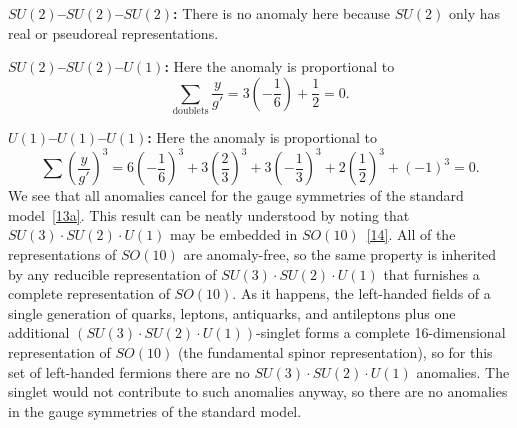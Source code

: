 \noindent\textbf{\boldmath$SU(2)$--$SU(2)$--$SU(2)$:}
There is no anomaly here because $SU(2)$ only has real or pseudoreal
representations.

\noindent\textbf{\boldmath$SU(2)$--$SU(2)$--$U(1)$:}
Here the anomaly is proportional to
\[
 \sum_{\text{doublets}}\frac{y}{g'}
 =3\left(-\frac{1}{6}\right)+\frac{1}{2}=0.
\]

\noindent\textbf{\boldmath$U(1)$--$U(1)$--$U(1)$:}
Here the anomaly is proportional to
\[
 \sum\left(\frac{y}{g'}\right)^3
 =6\left(-\frac{1}{6}\right)^3
 +3\left(\frac{2}{3}\right)^3
 +3\left(-\frac{1}{3}\right)^3
 +2\left(\frac{1}{2}\right)^3
 +(-1)^3=0.
\]
We see that all anomalies cancel for the gauge symmetries of the standard
model~\hyperref[ch22-ref-13a]{[13a]}. This result can be neatly understood
by noting that $SU(3)\cdot SU(2)\cdot U(1)$ may be embedded in
$SO(10)$~\hyperref[ch22-ref-14]{[14]}. All of the representations of
$SO(10)$ are anomaly-free, so the same property is inherited by any
reducible representation of $SU(3)\cdot SU(2)\cdot U(1)$ that furnishes a
complete representation of $SO(10)$. As it happens, the left-handed fields
of a single generation of quarks, leptons, antiquarks, and antileptons plus
one additional $(SU(3)\cdot SU(2)\cdot U(1))$-singlet forms a complete
16-dimensional representation of $SO(10)$ (the fundamental spinor
representation), so for this set of left-handed fermions there are no
$SU(3)\cdot SU(2)\cdot U(1)$ anomalies. The singlet would not contribute
to such anomalies anyway, so there are no anomalies in the gauge
symmetries of the standard model.

